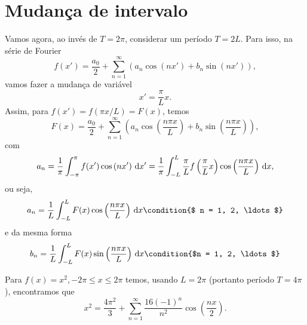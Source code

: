 \section{Mudança de intervalo}
Vamos agora, ao invés de $T = 2 \pi$, considerar um período $T = 2 L$. Para
isso, na série de Fourier
\begin{dmath*}
  f(x') = \frac{a_0}{2} + \sum_{n = 1}^\infty \left( a_n \cos\left( n x' \right)
  + b_n \sin\left( n x' \right) \right),
\end{dmath*}
vamos fazer a mudança de variável
\begin{dmath*}
  x' = \frac{\pi}{L} x.
\end{dmath*}
Assim, para $f(x') = f(\pi x / L) = F(x)$, temos
\begin{dmath*}
  F(x) = \frac{a_0}{2} + \sum_{n = 1}^\infty \left( a_n \cos\left( \frac{n \pi
  x}{L} \right) + b_n \sin\left( \frac{n \pi x}{L} \right) \right),
\end{dmath*}
com
\begin{dmath*}
  a_n = \frac{1}{\pi} \int_{-\pi}^\pi f(x') \cos\left( n x' \right) \vi{x'} =
  \frac{1}{\pi} \int_{-L}^L \frac{\pi}{L} f\left( \frac{\pi}{L} x \right)
  \cos\left( \frac{n \pi x}{L} \right) \vi{x},
\end{dmath*}
ou seja,
\begin{dmath*}
  a_n = \frac{1}{L} \int_{-L}^L F(x) \cos\left( \frac{n \pi x}{L} \right)
  \vi{x} \condition{$ n = 1, 2, \ldots$}
\end{dmath*}
e da mesma forma
\begin{dmath*}
  b_n = \frac{1}{L} \int_{-L}^L F(x) \sin\left( \frac{n \pi x}{L} \right)
  \vi{x} \condition{$n = 1, 2, \ldots$}
\end{dmath*}

\begin{exem}
  Para $f(x) = x^2, - 2 \pi \leq x \leq 2 \pi$ temos, usando $L = 2 \pi$
  (portanto período $T = 4\pi$), encontramos que
  \begin{dmath*}
    x^2 = \frac{4 \pi^2}{3} + \sum_{n = 1}^\infty \frac{16 (-1)^n}{n^2}
    \cos\left( \frac{n x}{2} \right).
  \end{dmath*}
\end{exem}

